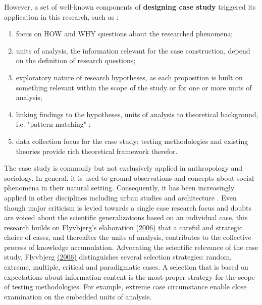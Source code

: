 \documentclass[11pt]{report}
\begin{document}
However, a set of well-known components of \textbf{designing case study} triggered its application in this research, such as \cite{(Yin 2009)}:
\begin{enumerate}
\item focus on HOW and WHY questions about the researched phenomena;
\item units of analysis, the information relevant for the case construction, depend on the definition of research questions;
\item exploratory nature of research hypotheses, as each proposition is built on something relevant within the scope of the study or for one or more units of analysis;
\item linking findings to the hypotheses, units of analysis to theoretical background, i.e. "pattern matching" \cite{Campbell 1975};
\item data collection focus for the case study; testing methodologies and existing theories provide rich theoretical framework therefor.
\end{enumerate}

The case study is commonly but not exclusively applied in anthropology and sociology.
In general, it is used to ground observations and concepts about social phenomena in their natural setting. Consequently, it has been increasingly applied in other disciplines including urban studies and architecture \cite{(Feagin et al. 1991)}. Even though major criticism is levied towards a single case research focus and doubts are voiced about the scientific generalizations based on an individual case, this research builds on Flyvbjerg's elaboration \href{}{(2006)} that a careful and strategic choice of cases, and thereafter the units of analysis, contributes to the collective process of knowledge accumulation.
Advocating the scientific relevance of the case study, Flyvbjerg \href{}{(2006)} distinguishes several selection strategies: random, extreme, multiple, critical and paradigmatic cases. A selection that is based on expectations about information content is the most proper strategy for the scope of testing methodologies. For example, extreme case circumstance enable close examination on the embedded units of analysis.
\\
\end{document}

